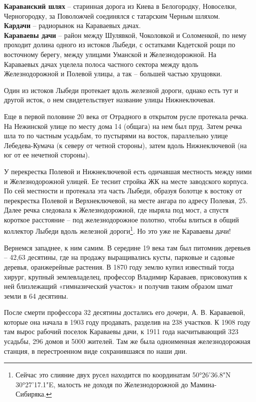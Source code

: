 \textbf{Караванский шлях} – старинная дорога из Киева в Белогородку, Новоселки, Черногородку, за Поволожчей соединялся с татарским Черным шляхом.\\

\textbf{Кардачи} – радиорынок на Караваевых дачах.\\

\textbf{Караваевы дачи} – район между Шулявкой, Чоколовкой и Соломенкой, по нему проходит долина одного из истоков Лыбеди, с остатками Кадетской рощи по восточному берегу, между улицами Уманской и Железнодорожной. На Караваевых дачах уцелела полоса частного сектора между вдоль Железнодорожной и Полевой улицы, а так – большей частью хрущовки.

Один из истоков Лыбеди протекает вдоль железной дороги, однако есть тут и другой исток, о нем свидетельствует название улицы Нижнеключевая.

Еще в первой половине 20 века от Отрадного в открытом русле протекала речка. На Нежинской улице по месту дома 14 (общага) на нем был пруд. Затем речка шла то по частным усадьбам, то пустырями на восток, параллельно улице Лебедева-Кумача (к северу от четной стороны), затем вдоль Нижнеключевой (на юг от ее нечетной стороны). 

У перекрестка Полевой и Нижнеключевой есть одичавшая местность между ними и Железнодорожной улицей. Ее теснит стройка ЖК на месте заводского корпуса. По сей местности и протекала эта часть Лыбеди, образуя болотце к востоку от перекрестка Полевой и Верхнеключевой, на месте ангара по адресу Полевая, 25. Далее речка следовала к Железнодорожной, где ныряла под мост, а спустя короткое расстояние – под железнодорожное полотно, чтобы влиться в общий коллектор Лыбеди вдоль железной дороги\footnote{Сейчас это слияние двух русел находится по координатам 50°26'36.8"N 30°27'17.1"E, малость не доходя по Железнодорожной до Мамина-Сибиряка.}. Но это уже не Караваевы дачи!

Вернемся западнее, к ним самим. В середине 19 века там был питомник деревьев – 42,63 десятины, где на продажу выращивались кусты, парковые и садовые деревья, оранжерейные растения. В 1870 году землю купил известный тогда хирург, крупный землевладелец, профессор Владимир Караваев, присовокупив к ней близлежащий «гимназический участок» и получив таким образом шмат земли в 64 десятины. 

После смерти профессора 32 десятины достались его дочери, А. В. Караваевой, которые она начала в 1903 году продавать, разделив на 238 участков. К 1908 году там вырос рабочий поселок Караваевы дачи, к 1911 года насчитывающий 323 усадьбы, 296 домов и 5000 жителей. Там же была одноименная железнодорожная станция, в перестроенном виде сохранившаяся по наши дни.\\ 

